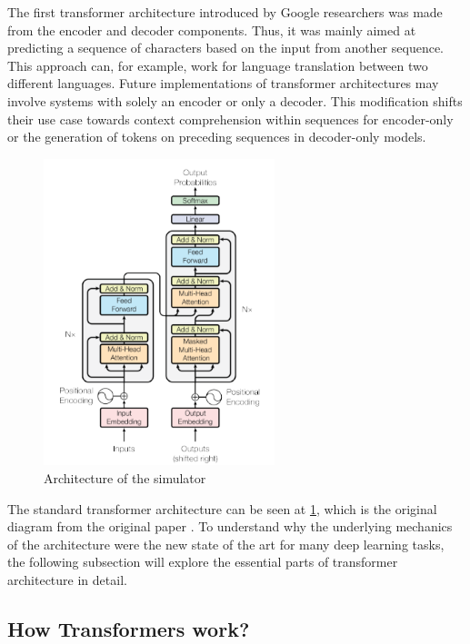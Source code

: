 The first transformer architecture introduced by Google researchers \cite{attention} was made from the encoder and decoder components. Thus, it was mainly aimed at predicting a sequence of characters based on the input from another sequence. This approach can, for example, work for language translation between two different languages. Future implementations of transformer architectures may involve systems with solely an encoder or only a decoder. This modification shifts their use case towards context comprehension within sequences for encoder-only or the generation of tokens on preceding sequences in decoder-only models.

\begin{figure}[ht]
\label{architecture}
    \centering
    \includegraphics[width=0.6\textwidth]{obrazky-figures/transformers-architecture.png}
    \caption{Architecture of the simulator}
\end{figure}

The standard transformer architecture can be seen at \ref{architecture}, which is the original diagram from the original paper \cite{attention}. To understand why the underlying mechanics of the architecture were the new state of the art for many deep learning tasks, the following subsection will explore the essential parts of transformer architecture in detail. 

\subsection{How Transformers work?}

